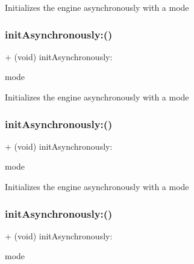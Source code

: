 Initializes the engine asynchronously with a mode \mbox{\label{interfaceCDAudioManager_a208d173cd07d3ace248aff4bb16839b9}} 
\subsubsection{\texorpdfstring{init\+Asynchronously\+:()}{initAsynchronously:()}\hspace{0.1cm}{\footnotesize\ttfamily [2/4]}}
{\footnotesize\ttfamily + (void) init\+Asynchronously\+: \begin{DoxyParamCaption}\item[{(t\+Audio\+Manager\+Mode)}]{mode }\end{DoxyParamCaption}}

Initializes the engine asynchronously with a mode \mbox{\label{interfaceCDAudioManager_a208d173cd07d3ace248aff4bb16839b9}} 
\subsubsection{\texorpdfstring{init\+Asynchronously\+:()}{initAsynchronously:()}\hspace{0.1cm}{\footnotesize\ttfamily [3/4]}}
{\footnotesize\ttfamily + (void) init\+Asynchronously\+: \begin{DoxyParamCaption}\item[{(t\+Audio\+Manager\+Mode)}]{mode }\end{DoxyParamCaption}}

Initializes the engine asynchronously with a mode \mbox{\label{interfaceCDAudioManager_a208d173cd07d3ace248aff4bb16839b9}} 
\subsubsection{\texorpdfstring{init\+Asynchronously\+:()}{initAsynchronously:()}\hspace{0.1cm}{\footnotesize\ttfamily [4/4]}}
{\footnotesize\ttfamily + (void) init\+Asynchronously\+: \begin{DoxyParamCaption}\item[{(t\+Audio\+Manager\+Mode)}]{mode }\end{DoxyParamCaption}}

